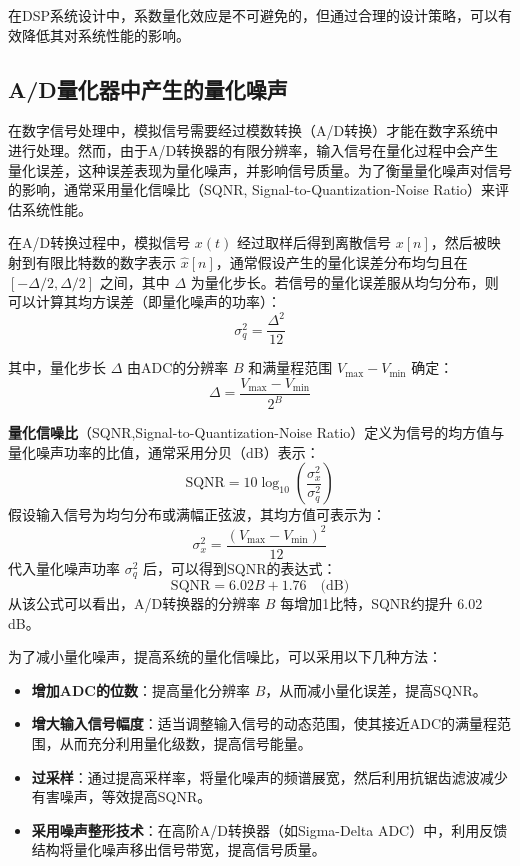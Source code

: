 在DSP系统设计中，系数量化效应是不可避免的，但通过合理的设计策略，可以有效降低其对系统性能的影响。
\subsection{A/D量化器中产生的量化噪声}
在数字信号处理中，模拟信号需要经过模数转换（A/D转换）才能在数字系统中进行处理。然而，由于A/D转换器的有限分辨率，输入信号在量化过程中会产生量化误差，这种误差表现为量化噪声，并影响信号质量。为了衡量量化噪声对信号的影响，通常采用量化信噪比（SQNR, Signal-to-Quantization-Noise Ratio）来评估系统性能。


在A/D转换过程中，模拟信号 \( x(t) \) 经过取样后得到离散信号 \( x[n] \)，然后被映射到有限比特数的数字表示 \( \hat{x}[n] \)，通常假设产生的量化误差分布均匀且在\([- \Delta /2, \Delta /2]\) 之间，其中 \( \Delta \) 为量化步长。若信号的量化误差服从均匀分布，则可以计算其均方误差（即量化噪声的功率）：
\begin{equation}
  \sigma_q^2 = \frac{\Delta^2}{12}
\end{equation}


其中，量化步长 \( \Delta \) 由ADC的分辨率 \( B \) 和满量程范围 \( V_{\max} - V_{\min} \) 确定：
\begin{equation}
  \Delta = \frac{V_{\max} - V_{\min}}{2^B}
\end{equation}


\textbf{量化信噪比}（SQNR,Signal-to-Quantization-Noise Ratio）定义为信号的均方值与量化噪声功率的比值，通常采用分贝（dB）表示：
\[
\text{SQNR} = 10 \log_{10} \left( \frac{\sigma_x^2}{\sigma_q^2} \right)
\]
假设输入信号为均匀分布或满幅正弦波，其均方值可表示为：
\[
\sigma_x^2 = \frac{(V_{\max} - V_{\min})^2}{12}
\]
代入量化噪声功率 \(\sigma_q^2\) 后，可以得到SQNR的表达式：
\[
\text{SQNR} = 6.02B + 1.76 \quad \text{(dB)}
\]
从该公式可以看出，A/D转换器的分辨率 \( B \) 每增加1比特，SQNR约提升 6.02 dB。

为了减小量化噪声，提高系统的量化信噪比，可以采用以下几种方法：
\begin{itemize}
    \item \textbf{增加ADC的位数}：提高量化分辨率 \( B \)，从而减小量化误差，提高SQNR。
    \item \textbf{增大输入信号幅度}：适当调整输入信号的动态范围，使其接近ADC的满量程范围，从而充分利用量化级数，提高信号能量。
    \item \textbf{过采样}：通过提高采样率，将量化噪声的频谱展宽，然后利用抗锯齿滤波减少有害噪声，等效提高SQNR。
    \item \textbf{采用噪声整形技术}：在高阶A/D转换器（如Sigma-Delta ADC）中，利用反馈结构将量化噪声移出信号带宽，提高信号质量。
\end{itemize}


